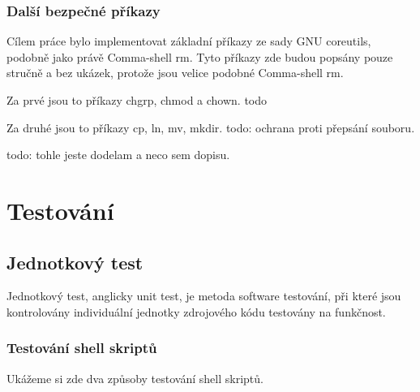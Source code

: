 \documentclass[thesis=M,czech]{FITthesis}[2012/06/26]
\begin{document}
\subsection{Další bezpečné příkazy}

Cílem práce bylo implementovat základní příkazy ze sady GNU coreutils, podobně jako právě Comma-shell rm. Tyto příkazy zde budou popsány pouze stručně a bez ukázek, protože jsou velice podobné Comma-shell rm.

Za prvé jsou to příkazy chgrp, chmod a chown. todo

Za druhé jsou to příkazy cp, ln, mv, mkdir. todo: ochrana proti přepsání souboru.

todo: tohle jeste dodelam a neco sem dopisu.




%
%
\chapter{Testování}

%
\section{Jednotkový test}

Jednotkový test, anglicky unit test, je metoda software testování, při které jsou kontrolovány individuální jednotky zdrojového kódu testovány na funkčnost. 

%
\subsection{Testování shell skriptů}

Ukážeme si zde dva způsoby testování shell skriptů.
\end{document}
